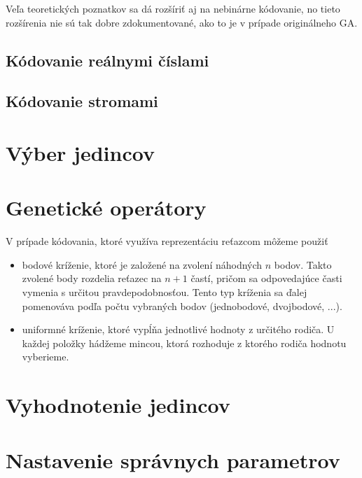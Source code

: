 Veľa teoretických poznatkov sa dá rozšíriť aj na nebinárne kódovanie, no tieto rozšírenia nie sú tak dobre zdokumentované, ako to je v prípade originálneho GA.
\subsection{Kódovanie reálnymi číslami}\label{kap2:2.2:2.2.2:RealValued}

\subsection{Kódovanie stromami}\label{kap2:2.2:2.2.3:Tree}

\section{Výber jedincov}\label{kap2:2.3:Selection}

\section{Genetické operátory}\label{kap2:2.4:Operators}
V prípade kódovania, ktoré využíva reprezentáciu reťazcom môžeme použiť
\begin{itemize}
\item bodové kríženie, ktoré je založené na zvolení náhodných $n$ bodov. Takto zvolené body rozdelia reťazec na $n+1$ častí, pričom sa odpovedajúce časti vymenia s určitou pravdepodobnosťou. Tento typ kríženia sa ďalej pomenováva podľa počtu vybraných bodov (jednobodové, dvojbodové, ...).
\item uniformné kríženie, ktoré vypĺňa jednotlivé hodnoty z určitého rodiča. U každej položky hádžeme mincou, ktorá rozhoduje z ktorého rodiča hodnotu vyberieme.
\end{itemize}

\section{Vyhodnotenie jedincov}\label{kap2:2.5:Fitnesses}

\section{Nastavenie správnych parametrov}\label{kap2:2.6:Parameters}

